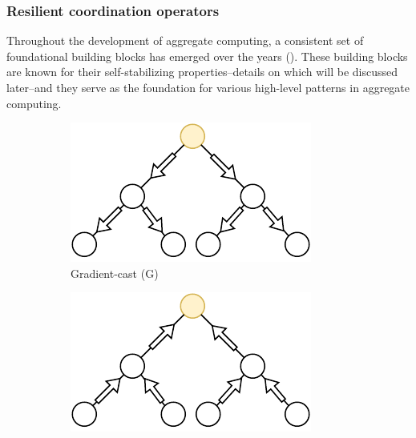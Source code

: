 \subsubsection{Resilient coordination operators}\label{sec:field-calculus-building-blocks}
Throughout the development of aggregate computing, 
 a consistent set of foundational building blocks has emerged over the years (). 
 These building blocks are known for their self-stabilizing properties--details on which will be discussed later--and they serve as the foundation for various high-level patterns in aggregate computing.
\begin{figure}
    \begin{subfigure}{0.3\textwidth}
        \centering
        \includegraphics[width=\textwidth]{chapters/img/g.drawio.pdf}
        \caption{Gradient-cast (G)}\label{fig:gradient-cast}
    \end{subfigure}
    \begin{subfigure}{0.3\textwidth}
        \centering
        \includegraphics[width=\textwidth]{chapters/img/c.drawio.pdf}

\end{subfigure}
\end{figure}
